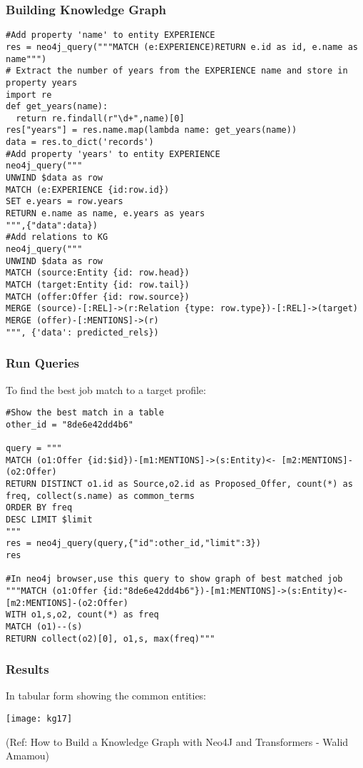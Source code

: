 \begin{frame}[fragile]\frametitle{Building Knowledge Graph}


\begin{lstlisting}
#Add property 'name' to entity EXPERIENCE
res = neo4j_query("""MATCH (e:EXPERIENCE)RETURN e.id as id, e.name as name""")
# Extract the number of years from the EXPERIENCE name and store in property years
import re
def get_years(name):
  return re.findall(r"\d+",name)[0]
res["years"] = res.name.map(lambda name: get_years(name))
data = res.to_dict('records')
#Add property 'years' to entity EXPERIENCE
neo4j_query("""
UNWIND $data as row
MATCH (e:EXPERIENCE {id:row.id})
SET e.years = row.years
RETURN e.name as name, e.years as years
""",{"data":data})
#Add relations to KG
neo4j_query("""
UNWIND $data as row
MATCH (source:Entity {id: row.head})
MATCH (target:Entity {id: row.tail})
MATCH (offer:Offer {id: row.source})
MERGE (source)-[:REL]->(r:Relation {type: row.type})-[:REL]->(target)
MERGE (offer)-[:MENTIONS]->(r)
""", {'data': predicted_rels})	 
\end{lstlisting}

\end{frame}

\begin{frame}[fragile]\frametitle{Run Queries}

To find the best job match to a target profile:

\begin{lstlisting}
#Show the best match in a table
other_id = "8de6e42dd4b6"

query = """
MATCH (o1:Offer {id:$id})-[m1:MENTIONS]->(s:Entity)<- [m2:MENTIONS]-(o2:Offer)  
RETURN DISTINCT o1.id as Source,o2.id as Proposed_Offer, count(*) as freq, collect(s.name) as common_terms
ORDER BY freq
DESC LIMIT $limit
"""
res = neo4j_query(query,{"id":other_id,"limit":3})
res

#In neo4j browser,use this query to show graph of best matched job
"""MATCH (o1:Offer {id:"8de6e42dd4b6"})-[m1:MENTIONS]->(s:Entity)<- [m2:MENTIONS]-(o2:Offer) 
WITH o1,s,o2, count(*) as freq
MATCH (o1)--(s)
RETURN collect(o2)[0], o1,s, max(freq)"""
\end{lstlisting}

\end{frame}

\begin{frame}[fragile]\frametitle{Results}

In tabular form showing the common entities:

			\begin{center}
			\texttt{[image: kg17]}
			\end{center}	
			
			{\tiny (Ref: How to Build a Knowledge Graph with Neo4J and Transformers - Walid Amamou)}	
			
\end{frame}

